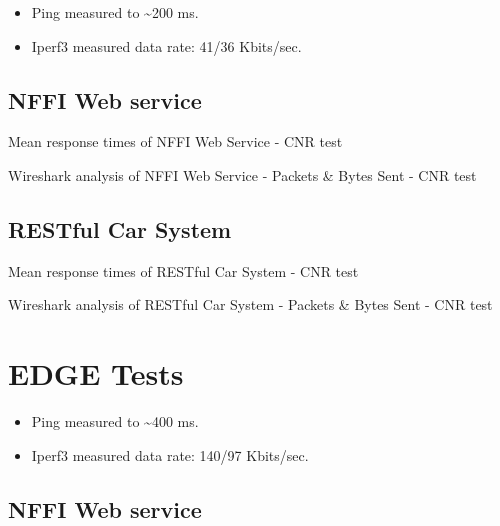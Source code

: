 \begin{appendices}
\begin{itemize}
	\item Ping measured to \textasciitilde 200 ms.
	\item Iperf3 measured data rate: 41/36 Kbits/sec.
\end{itemize}


\subsection{NFFI Web service}

\begin{table}[H]

\caption{Mean response times of NFFI Web Service - CNR test}
\end{table}

\begin{table}[H]

\caption{Wireshark analysis of NFFI Web Service - Packets \& Bytes Sent - CNR test}
\end{table}


\subsection{RESTful Car System}

\begin{table}[H]

\caption{Mean response times of RESTful Car System - CNR test}
\end{table}

\begin{table}[H]

\caption{Wireshark analysis of RESTful Car System - Packets \& Bytes Sent - CNR test}
\end{table}


\section{EDGE Tests}

\begin{itemize}
	\item Ping measured to \textasciitilde 400 ms.
	\item Iperf3 measured data rate: 140/97 Kbits/sec.
\end{itemize}

\subsection{NFFI Web service}


\end{appendices}
